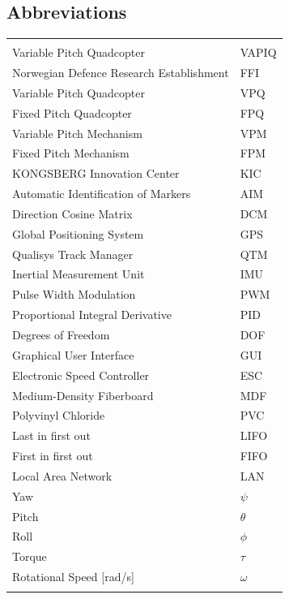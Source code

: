 \documentclass{article}
\begin{document}
\begin{center}
\section*{\textbf{Abbreviations}}
\begin{tabular}{l|l}
\rowcolor{cadetgrey}
 & \\
Variable Pitch Quadcopter   & VAPIQ\\\rowcolor{gainsboro}
Norwegian Defence Research Establishment  & FFI\\
Variable Pitch Quadcopter & VPQ\\\rowcolor{gainsboro}
Fixed Pitch Quadcopter & FPQ\\
Variable Pitch Mechanism & VPM\\\rowcolor{gainsboro}
Fixed Pitch Mechanism & FPM\\
KONGSBERG Innovation Center & KIC \\\rowcolor{gainsboro}
Automatic Identification of Markers & AIM\\
Direction Cosine Matrix & DCM \\\rowcolor{gainsboro}
Global Positioning System & GPS \\
Qualisys Track Manager & QTM \\\rowcolor{gainsboro}
Inertial Measurement Unit & IMU \\
Pulse Width Modulation & PWM \\\rowcolor{gainsboro}
Proportional Integral Derivative & PID \\
Degrees of Freedom & DOF \\\rowcolor{gainsboro}
Graphical User Interface & GUI \\
Electronic Speed Controller & ESC \\\rowcolor{gainsboro}
Medium-Density Fiberboard & MDF \\
Polyvinyl Chloride & PVC \\\rowcolor{gainsboro}
Last in first out & LIFO \\
First in first out & FIFO \\\rowcolor{gainsboro}
Local Area Network & LAN \\
Yaw & $\psi$ \\\rowcolor{gainsboro}
Pitch & $\theta$  \\
Roll & $\phi$  \\\rowcolor{gainsboro}
Torque & $\tau$ \\
Rotational Speed [rad/s] & $\omega$ \\\rowcolor{gainsboro}

\end{tabular}
\end{center}
\end{document}
